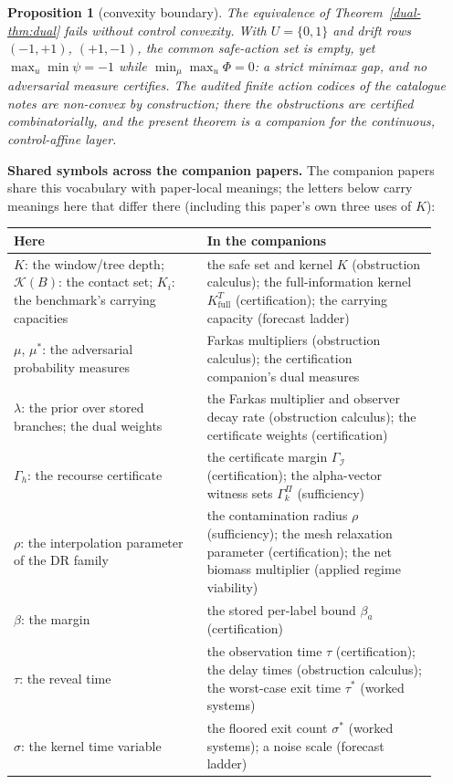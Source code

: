 \documentclass[10pt,twocolumn]{article}
\theoremstyle{plain}
\newtheorem{proposition}[theorem]{Proposition}
\theoremstyle{definition}
\theoremstyle{remark}
\begin{document}
\begin{proposition}[convexity boundary]\label{dual-prop:gap}
The equivalence of Theorem~\ref{dual-thm:dual} fails without control
convexity. With $U = \{0,1\}$ and drift rows
$(-1,+1)$, $(+1,-1)$, the common safe-action set is empty, yet
$\max_{u}\min\psi = -1$ while $\min_{\mu}\max_{u}\Phi = 0$: a strict
minimax gap, and no adversarial measure certifies. The audited finite
action codices of the catalogue notes are non-convex by construction;
there the obstructions are certified combinatorially, and the present
theorem is a companion for the continuous, control-affine layer.
\end{proposition}

\medskip
\noindent\textbf{Shared symbols across the companion papers.} The
companion papers share this vocabulary with paper-local meanings; the
letters below carry meanings here that differ there (including this
paper's own three uses of $K$):
\begin{center}\small
\begin{tabular}{@{}p{0.42\linewidth}p{0.50\linewidth}@{}}
\toprule
\textbf{Here} & \textbf{In the companions} \\
\midrule
$K$: the window/tree depth; $\mathcal{K}(B)$: the contact set; $K_{i}$: the benchmark's carrying capacities & the safe set and kernel $K$ (obstruction calculus); the full-information kernel $K^{T}_{\mathrm{full}}$ (certification); the carrying capacity (forecast ladder) \\
$\mu$, $\mu^{*}$: the adversarial probability measures & Farkas multipliers (obstruction calculus); the certification companion's dual measures \\
$\lambda$: the prior over stored branches; the dual weights & the Farkas multiplier and observer decay rate (obstruction calculus); the certificate weights (certification) \\
$\Gamma_{h}$: the recourse certificate & the certificate margin $\Gamma_{\mathcal{I}}$ (certification); the alpha-vector witness sets $\Gamma^{\Pi}_{k}$ (sufficiency) \\
$\rho$: the interpolation parameter of the DR family & the contamination radius $\rho$ (sufficiency); the mesh relaxation parameter (certification); the net biomass multiplier (applied regime viability) \\
$\beta$: the margin & the stored per-label bound $\beta_{a}$ (certification) \\
$\tau$: the reveal time & the observation time $\tau$ (certification); the delay times (obstruction calculus); the worst-case exit time $\tau^{*}$ (worked systems) \\
$\sigma$: the kernel time variable & the floored exit count $\sigma^{*}$ (worked systems); a noise scale (forecast ladder) \\
\bottomrule
\end{tabular}
\end{center}
\end{document}
